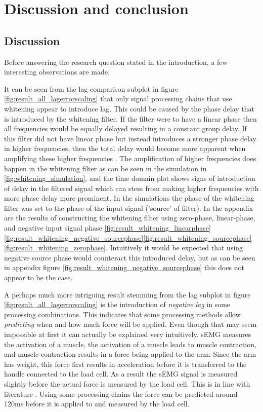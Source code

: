\chapter{Discussion and conclusion}
\section{Discussion}
Before answering the research question stated in the introduction, a few interesting observations are made.

It can be seen from the lag comparison subplot in figure \ref{fig:result_all_lagerrorscaling} that only signal processing chains that use whitening appear to introduce lag. This could be caused by the phase delay that is introduced by the whitening filter. If the filter were to have a linear phase then all frequencies would be equally delayed resulting in a constant group delay. If this filter did not have linear phase but instead introduces a stronger phase delay in higher frequencies, then the total delay would become more apparent when amplifying these higher frequencies \cite{phase_delay_frequencies}. The amplification of higher frequencies does happen in the whitening filter as can be seen in the simulation in \ref{fig:whitening_simulation}, and the time domain plot shows signs of introduction of delay in the filtered signal which can stem from making higher frequencies with more phase delay more prominent. In the simulations the phase of the whitening filter was set to the phase of the input signal ('source' of filter). In the appendix are the results of constructing the whitening filter using zero-phase, linear-phase, and negative input signal phase \ref{fig:result_whitening_linearphase} \ref{fig:result_whitening_negative_sourcephase}\ref{fig:result_whitening_sourcephase}\ref{fig:result_whitening_zerophase}. Intuitively it would be expected that using negative source phase would counteract this introduced delay, but as can be seen in appendix figure \ref{fig:result_whitening_negative_sourcephase} this does not appear to be the case.

A perhaps much more intriguing result stemming from the lag subplot in figure \ref{fig:result_all_lagerrorscaling} is the introduction of \textit{negative lag} in some processing combinations. This indicates that some processing methods allow \textit{predicting} when and how much force will be applied. Even though that may seem impossible at first it can actually be explained very intuitively. sEMG measures the activation of a muscle, the activation of a muscle leads to muscle contraction, and muscle contraction results in a force being applied to the arm. Since the arm has weight, this force first results in acceleration before it is transferred to the handle connected to the load cell. As a result the sEMG signal is measured slightly before the actual force is measured by the load cell. This is in line with literature \cite{human_robotics}. Using some processing chains the force can be predicted around 120ms before it is applied to and measured by the load cell.

